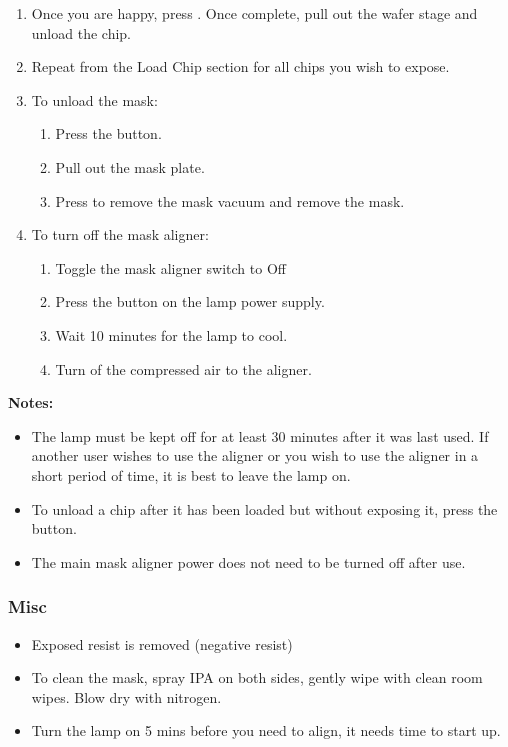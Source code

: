 \begin{enumerate}
\begin{enumerate} 
\end{enumerate}
\item Once you are happy, press . Once complete, pull out the wafer stage and unload the chip.
\item Repeat from the Load Chip section for all chips you wish to expose.
\item To unload the mask:
\begin{enumerate} 
  \item Press the  button.
  \item Pull out the mask plate.
  \item Press  to remove the mask vacuum and remove the mask.
\end{enumerate}
\item To turn off the mask aligner:
\begin{enumerate} 
  \item Toggle the mask aligner switch to Off
  \item Press the  button on the lamp power supply.
  \item Wait 10 minutes for the lamp to cool.
  \item Turn of the compressed air to the aligner.
\end{enumerate}
\end{enumerate}
\textbf{Notes:}
\begin{itemize} [noitemsep, nolistsep]
  \item The lamp must be kept off for at least 30 minutes after it was last used. If another user wishes to use the aligner
        or you wish to use the aligner in a short period of time, it is best to leave the lamp on.
  \item To unload a chip after it has been loaded but without exposing it, press the  button.
  \item The main mask aligner power does not need to be turned off after use.
\end{itemize}
\newpage
\subsubsection{Misc}
\begin{itemize}
\item Exposed resist is removed (negative resist)
\item To clean the mask, spray IPA on both sides, gently wipe with clean room wipes. Blow dry with nitrogen.
\item Turn the lamp on 5 mins before you need to align, it needs time to start up.
\end{itemize}
\newpage


